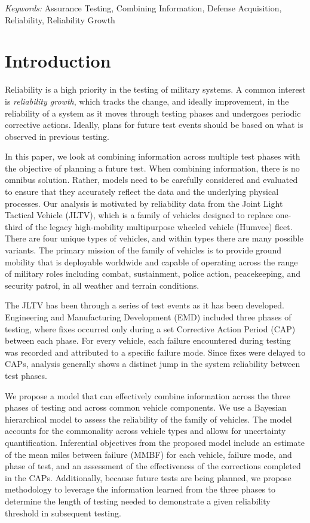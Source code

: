 \documentclass[12pt]{article}
\begin{document}
\noindent%
{\it Keywords:}  Assurance Testing, Combining Information, Defense Acquisition, Reliability, Reliability Growth
\vfill

\newpage

\section{Introduction}
Reliability is a high priority in the testing of military systems. A common
interest is {\em reliability growth}, which tracks the change, and ideally
improvement, in the reliability of a system as it moves through testing phases
and undergoes periodic corrective actions. Ideally, plans for future test events
should be based on what is observed in previous testing.

In this paper, we look at combining information across multiple test phases with
the objective of planning a future test. When combining information, there is no
omnibus solution. Rather, models need to be carefully considered and evaluated
to ensure that they accurately reflect the data and the underlying physical
processes. Our analysis is motivated by reliability data from the Joint Light
Tactical Vehicle (JLTV), which is a family of vehicles designed to replace
one-third of the legacy high-mobility multipurpose wheeled vehicle (Humvee)
fleet. There are four unique types of vehicles, and within types there are many
possible variants. The primary mission of the family of vehicles is to provide
ground mobility that is deployable worldwide and capable of operating across the
range of military roles including combat, sustainment, police action,
peacekeeping, and security patrol, in all weather and terrain conditions.

The JLTV has been through a series of test events as it has been developed.
Engineering and Manufacturing Development (EMD) included three phases of
testing, where fixes occurred only during a set Corrective Action Period (CAP)
between each phase. For every vehicle, each failure encountered during testing
was recorded and attributed to a specific failure mode.  Since fixes were
delayed to CAPs, analysis generally shows a distinct jump in the system
reliability between test phases.

We propose a model that can effectively combine information across the three
phases of testing and across common vehicle components. We use a Bayesian
hierarchical model to assess the reliability of the family of vehicles. The
model accounts for the commonality across vehicle types and allows for
uncertainty quantification. Inferential objectives from the proposed model
include an estimate of the mean miles between failure (MMBF) for each vehicle,
failure mode, and phase of test, and an assessment of the effectiveness of the
corrections completed in the CAPs. Additionally, because future tests are being
planned, we propose methodology to leverage the information learned from the
three phases to determine the length of testing needed to demonstrate a given
reliability threshold in subsequent testing.
\end{document}
